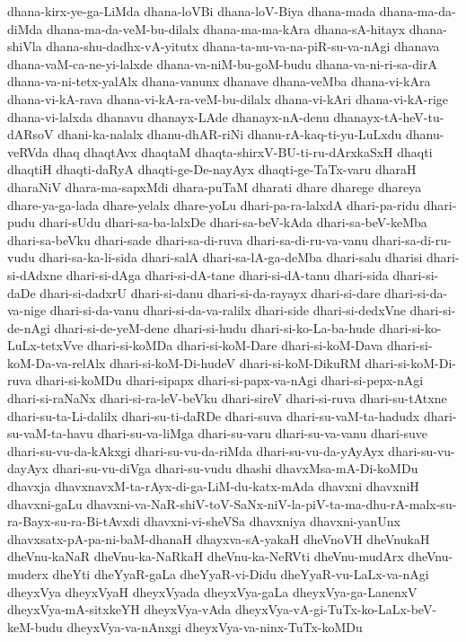 {dhana-kirx-ye-ga-LiMda
dhana-loVBi
dhana-loV-Biya
dhana-mada
dhana-ma-da-diMda
dhana-ma-da-veM-bu-dilalx
dhana-ma-ma-kAra
dhana-sA-hitayx
dhana-shiVla
dhana-shu-dadhx-vA-yitutx
dhana-ta-nu-va-na-piR-su-va-nAgi
dhanava
dhana-vaM-ca-ne-yi-lalxde
dhana-va-niM-bu-goM-budu
dhana-va-ni-ri-sa-dirA
dhana-va-ni-tetx-yalAlx
dhana-vanunx
dhanave
dhana-veMba
dhana-vi-kAra
dhana-vi-kA-rava
dhana-vi-kA-ra-veM-bu-dilalx
dhana-vi-kAri
dhana-vi-kA-rige
dhana-vi-lalxda
dhanavu
dhanayx-LAde
dhanayx-nA-denu
dhanayx-tA-heV-tu-dARsoV
dhani-ka-nalalx
dhanu-dhAR-riNi
dhanu-rA-kaq-ti-yu-LuLxdu
dhanu-veRVda
dhaq
dhaqtAvx
dhaqtaM
dhaqta-shirxV-BU-ti-ru-dArxkaSxH
dhaqti
dhaqtiH
dhaqti-daRyA
dhaqti-ge-De-nayAyx
dhaqti-ge-TaTx-varu
dharaH
dharaNiV
dhara-ma-sapxMdi
dhara-puTaM
dharati
dhare
dharege
dhareya
dhare-ya-ga-lada
dhare-yelalx
dhare-yoLu
dhari-pa-ra-lalxdA
dhari-pa-ridu
dhari-pudu
dhari-sUdu
dhari-sa-ba-lalxDe
dhari-sa-beV-kAda
dhari-sa-beV-keMba
dhari-sa-beVku
dhari-sade
dhari-sa-di-ruva
dhari-sa-di-ru-va-vanu
dhari-sa-di-ru-vudu
dhari-sa-ka-li-sida
dhari-salA
dhari-sa-lA-ga-deMba
dhari-salu
dharisi
dhari-si-dAdxne
dhari-si-dAga
dhari-si-dA-tane
dhari-si-dA-tanu
dhari-sida
dhari-si-daDe
dhari-si-dadxrU
dhari-si-danu
dhari-si-da-rayayx
dhari-si-dare
dhari-si-da-va-nige
dhari-si-da-vanu
dhari-si-da-va-ralilx
dhari-side
dhari-si-dedxVne
dhari-si-de-nAgi
dhari-si-de-yeM-dene
dhari-si-hudu
dhari-si-ko-La-ba-hude
dhari-si-ko-LuLx-tetxVve
dhari-si-koMDa
dhari-si-koM-Dare
dhari-si-koM-Dava
dhari-si-koM-Da-va-relAlx
dhari-si-koM-Di-hudeV
dhari-si-koM-DikuRM
dhari-si-koM-Di-ruva
dhari-si-koMDu
dhari-sipapx
dhari-si-papx-va-nAgi
dhari-si-pepx-nAgi
dhari-si-raNaNx
dhari-si-ra-leV-beVku
dhari-sireV
dhari-si-ruva
dhari-su-tAtxne
dhari-su-ta-Li-dalilx
dhari-su-ti-daRDe
dhari-suva
dhari-su-vaM-ta-hadudx
dhari-su-vaM-ta-havu
dhari-su-va-liMga
dhari-su-varu
dhari-su-va-vanu
dhari-suve
dhari-su-vu-da-kAkxgi
dhari-su-vu-da-riMda
dhari-su-vu-da-yAyAyx
dhari-su-vu-dayAyx
dhari-su-vu-diVga
dhari-su-vudu
dhashi
dhavxMsa-mA-Di-koMDu
dhavxja
dhavxnavxM-ta-rAyx-di-ga-LiM-du-katx-mAda
dhavxni
dhavxniH
dhavxni-gaLu
dhavxni-va-NaR-shiV-toV-SaNx-niV-la-piV-ta-ma-dhu-rA-malx-su-ra-Bayx-su-ra-Bi-tAvxdi
dhavxni-vi-sheVSa
dhavxniya
dhavxni-yanUnx
dhavxsatx-pA-pa-ni-baM-dhanaH
dhayxva-sA-yakaH
dheVnoVH
dheVnukaH
dheVnu-kaNaR
dheVnu-ka-NaRkaH
dheVnu-ka-NeRVti
dheVnu-mudArx
dheVnu-muderx
dheYti
dheYyaR-gaLa
dheYyaR-vi-Didu
dheYyaR-vu-LaLx-va-nAgi
dheyxVya
dheyxVyaH
dheyxVyada
dheyxVya-gaLa
dheyxVya-ga-LanenxV
dheyxVya-mA-sitxkeYH
dheyxVya-vAda
dheyxVya-vA-gi-TuTx-ko-LaLx-beV-keM-budu
dheyxVya-va-nAnxgi
dheyxVya-va-ninx-TuTx-koMDu
}
